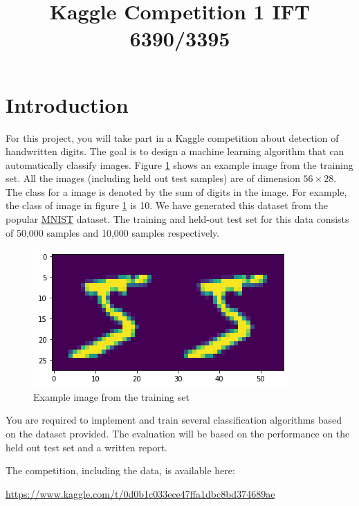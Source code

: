 \documentclass[12pt]{article}
\begin{document}
 
 
 
\title{Kaggle Competition 1 IFT 6390/3395}
 
\maketitle

\section{Introduction}
\label{sec:intro}

For this project, you will take part in a Kaggle competition about detection of handwritten digits. The goal is to design a machine learning algorithm that can automatically classify images. Figure \ref{fig:my_label} shows an example image from the training set. All the images (including held out test samples) are of dimension $56\times28$. The class for a image is denoted by the sum of digits in the image. For example, the class of image in figure \ref{fig:my_label} is 10. We have generated this dataset from the popular \href{http://yann.lecun.com/exdb/mnist/}{MNIST} dataset. The training and held-out test set for this data consists of 50,000 samples and 10,000 samples respectively.
\begin{figure}[h]
    \centering
    \includegraphics[width=0.5\linewidth]{figures/img1.png} 
    
    \caption{Example image from the training set}
    \label{fig:my_label}
\end{figure}
You are required to implement and train several classification algorithms based on the dataset provided. The evaluation will be based on the performance on the held out test set and a written report.

The competition, including the data, is available here: 

\begin{center}
\href{https://www.kaggle.com/t/0d0b1c033ece47ffa1dbc8bd374689ae}{https://www.kaggle.com/t/0d0b1c033ece47ffa1dbc8bd374689ae}
\end{center}
\end{document}
